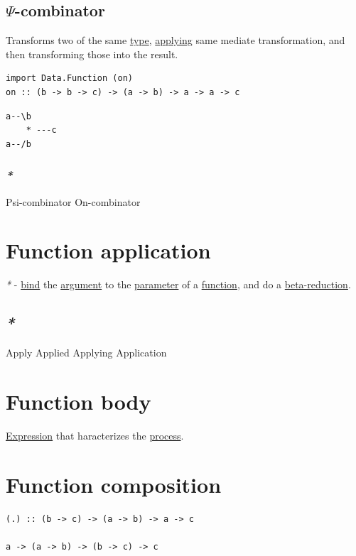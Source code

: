 \documentclass[a4paper,14pt,oneside]{book}
\begin{document}
\subsection{\label{org5a0cfc5}\(\Psi\)-combinator}
\label{sec:orgfd8f398}
Transforms two of the same \hyperref[org1eff537]{type}, \hyperref[orgeb986a0]{applying} same mediate transformation, and then transforming those into the result.
\begin{verbatim}
import Data.Function (on)
on :: (b -> b -> c) -> (a -> b) -> a -> a -> c
\end{verbatim}

\begin{verbatim}
a--\b
    * ---c
a--/b
\end{verbatim}

\subsubsection{\emph{*}}
\label{sec:orgcad4cb7}

\label{orgc2a0c28}Psi-combinator
\label{org01d1db8}On-combinator

\section{\label{org28a93c6}Function application}
\label{sec:org8649238}
\emph{*} - \hyperref[orgfc7e6a2]{bind} the \hyperref[org4072c80]{argument} to the \hyperref[orgae9d304]{parameter} of a \hyperref[org679af45]{function}, and do a \hyperref[orgf75d9c0]{beta-reduction}.

\subsection{\emph{*}}
\label{sec:org1f13fc4}

\label{orgf095be6}Apply
\label{orgf612c93}Applied
\label{orgeb986a0}Applying
\label{org59dd450}Application

\section{\label{org7cfd728}Function body}
\label{sec:org2ef11d2}
\hyperref[org7de5a0f]{Expression} that haracterizes the \hyperref[org4a79554]{process}.

\section{\label{org35d1ed9}Function composition}
\label{sec:org98180d2}
\begin{verbatim}
(.) :: (b -> c) -> (a -> b) -> a -> c

a -> (a -> b) -> (b -> c) -> c
\end{verbatim}
\end{document}
